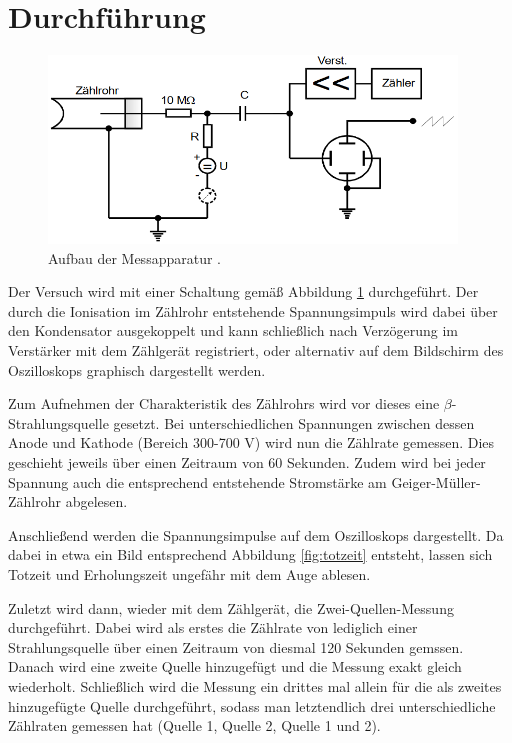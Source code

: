 \section{Durchführung}
\label{sec:Durchführung}

\begin{figure}[H]
  \centering
  \includegraphics[height=5cm]{Schaltung.PNG}
  \caption{Aufbau der Messapparatur \cite{sample}.}
  \label{fig:schaltung}
\end{figure}

Der Versuch wird mit einer Schaltung gemäß Abbildung \ref{fig:schaltung} durchgeführt.
Der durch die Ionisation im Zählrohr entstehende Spannungsimpuls wird dabei über den Kondensator
ausgekoppelt und kann schließlich nach Verzögerung im Verstärker mit dem Zählgerät registriert,
oder alternativ auf dem Bildschirm des Oszilloskops graphisch dargestellt werden.

Zum Aufnehmen der Charakteristik des Zählrohrs wird vor dieses eine $\beta$-Strahlungsquelle gesetzt.
Bei unterschiedlichen Spannungen zwischen dessen Anode und Kathode (Bereich 300-700 V) wird nun die
Zählrate gemessen. Dies geschieht jeweils über einen Zeitraum von 60 Sekunden. Zudem wird bei jeder
Spannung auch die entsprechend entstehende Stromstärke am Geiger-Müller-Zählrohr abgelesen.

Anschließend werden die Spannungsimpulse auf dem Oszilloskops dargestellt. Da dabei in etwa ein
Bild entsprechend Abbildung \ref{fig:totzeit} entsteht, lassen sich Totzeit und Erholungszeit
ungefähr mit dem Auge ablesen.

Zuletzt wird dann, wieder mit dem Zählgerät, die Zwei-Quellen-Messung durchgeführt.
Dabei wird als erstes die Zählrate von lediglich einer Strahlungsquelle über einen Zeitraum
von diesmal 120 Sekunden gemssen. Danach wird eine zweite Quelle hinzugefügt und die Messung
exakt gleich wiederholt. Schließlich wird die Messung ein drittes mal allein für die
als zweites hinzugefügte Quelle durchgeführt, sodass man letztendlich drei unterschiedliche
Zählraten gemessen hat (Quelle 1, Quelle 2, Quelle 1 und 2).

